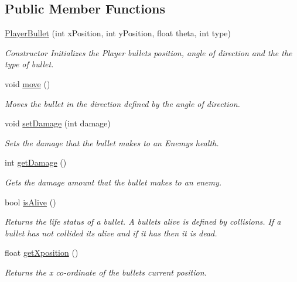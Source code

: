 \subsection*{Public Member Functions}
\begin{DoxyCompactItemize}
\item 
\hyperlink{class_player_bullet_ab48e600824aa9c70206810e37f918d52}{Player\+Bullet} (int x\+Position, int y\+Position, float theta, int type)
\begin{DoxyCompactList}\small\item\em Constructor Initializes the Player bullets position, angle of direction and the the type of bullet. \end{DoxyCompactList}\item 
void \hyperlink{class_player_bullet_a8469319697d70e04399d8aaac3902c80}{move} ()
\begin{DoxyCompactList}\small\item\em Moves the bullet in the direction defined by the angle of direction. \end{DoxyCompactList}\item 
void \hyperlink{class_player_bullet_a09347ab7665742fc7d492fe26c3a6bce}{set\+Damage} (int damage)
\begin{DoxyCompactList}\small\item\em Sets the damage that the bullet makes to an Enemy\textquotesingle{}s health. \end{DoxyCompactList}\item 
int \hyperlink{class_player_bullet_a55375b5c3f4f87d00daba1cda12b1e79}{get\+Damage} ()
\begin{DoxyCompactList}\small\item\em Gets the damage amount that the bullet makes to an enemy. \end{DoxyCompactList}\item 
bool \hyperlink{class_player_bullet_ab4e6b1485e9a63ddc00effc7532a9b09}{is\+Alive} ()
\begin{DoxyCompactList}\small\item\em Returns the life status of a bullet. A bullets alive is defined by collisions. If a bullet has not collided its alive and if it has then it is dead. \end{DoxyCompactList}\item 
float \hyperlink{class_player_bullet_aa9462c44892190316ee479a18693b6ad}{get\+Xposition} ()
\begin{DoxyCompactList}\small\item\em Returns the x co-\/ordinate of the bullets current position. \end{DoxyCompactList}\item 

\end{DoxyCompactItemize}
